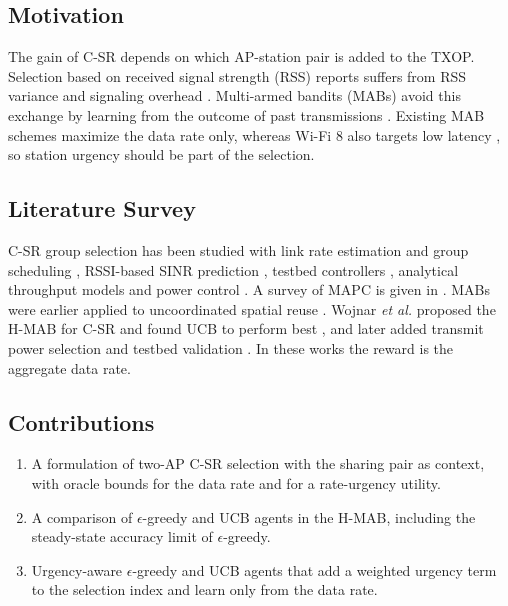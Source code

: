 \documentclass[journal]{IEEEtran}
\theoremstyle{definition}
\theoremstyle{remark}
\theoremstyle{plain}
\begin{document}
\subsection{Motivation}
The gain of C-SR depends on which AP-station pair is added to the TXOP. Selection based on received signal strength (RSS) reports suffers from RSS variance and signaling overhead \cite{kim2013rss,seok2020csr}. Multi-armed bandits (MABs) avoid this exchange by learning from the outcome of past transmissions \cite{wojnar2025hmab,wojnar2025jsac}. Existing MAB schemes maximize the data rate only, whereas Wi-Fi 8 also targets low latency \cite{galati2024wifi8}, so station urgency should be part of the selection.

\subsection{Literature Survey}
C-SR group selection has been studied with link rate estimation and group scheduling \cite{nunez2022txop,nunez2023group}, RSSI-based SINR prediction \cite{imputato2024beyond}, testbed controllers \cite{haxhibeqiri2024wfcs,haxhibeqiri2024commag}, analytical throughput models \cite{wilhelmi2023throughput} and power control \cite{wang2024fl,talukder2023enhanced}. A survey of MAPC is given in \cite{verma2024survey}. MABs were earlier applied to uncoordinated spatial reuse \cite{bardou2021improving,wilhelmi2019potential,wilhelmi2019collaborative,kim2024contextual,iturria2024cooperate}. Wojnar \textit{et al.} proposed the H-MAB for C-SR and found UCB to perform best \cite{wojnar2025hmab}, and later added transmit power selection and testbed validation \cite{wojnar2025jsac}. In these works the reward is the aggregate data rate.

\subsection{Contributions}
\begin{enumerate}
\item A formulation of two-AP C-SR selection with the sharing pair as context, with oracle bounds for the data rate and for a rate-urgency utility.
\item A comparison of $\epsilon$-greedy and UCB agents in the H-MAB, including the steady-state accuracy limit of $\epsilon$-greedy.
\item Urgency-aware $\epsilon$-greedy and UCB agents that add a weighted urgency term to the selection index and learn only from the data rate.
\end{enumerate}
\end{document}
